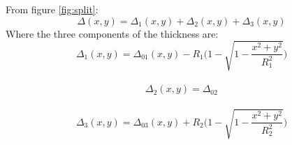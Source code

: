 From figure \ref{fig:split}:
\begin{equation}
\label{eq:split}
	\Delta(x,y)=\Delta_1(x,y)+\Delta_2(x,y)+\Delta_3(x,y)
\end{equation}
Where the three components of the thickness are:
\begin{equation}
\label{eq:delta1}
\Delta_1(x,y)=\Delta_{01}(x,y)-R_1\bigg(1-\sqrt{1-\frac{x^2+y^2}{R_1^2}}\bigg)
\end{equation}
\\
\begin{equation}
\label{eq:delta2}
\Delta_2(x,y)=\Delta_{02}
\end{equation}
\\
\begin{equation}
\label{eq:delta3}
\Delta_3(x,y)=\Delta_{03}(x,y)+R_2\bigg(1-\sqrt{1-\frac{x^2+y^2}{R_2^2}}\bigg)
\end{equation}
\\

